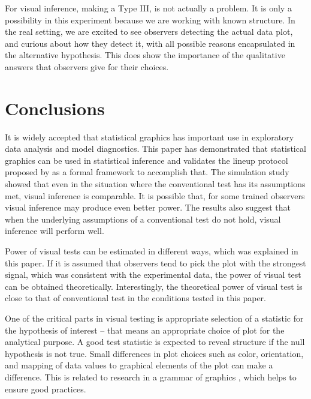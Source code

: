 \documentclass{article}
\begin{document}
For visual inference, making a Type III, is not actually a problem. It is only a possibility in this experiment because we are working with known structure. In the real setting, we are excited to see observers detecting the actual data plot, and curious about how they detect it, with all possible reasons encapsulated in the alternative hypothesis. This does show the importance of the qualitative answers that observers give for their choices.

\section{Conclusions}



It is widely accepted that statistical graphics has important use in exploratory data analysis and model diagnostics. This paper has demonstrated that statistical graphics can be used in statistical inference and validates the lineup protocol proposed by \citet{buja:2009} as a formal framework to accomplish that. The simulation study showed that even in the situation where the conventional test has its assumptions met, visual inference is comparable. It is possible that, for some trained observers visual inference may produce even better power. The results also suggest that when the underlying assumptions of a conventional test do not hold, visual inference will perform well. 

Power of visual tests can be estimated in different ways, which was explained in this paper. If it is assumed that observers tend to pick the plot with the strongest signal, which was consistent with the experimental data, the power of visual test can be obtained theoretically.  Interestingly, the theoretical power of visual test is close to that of conventional test in the conditions tested in this paper.


One of the critical parts in visual testing is appropriate selection of a statistic for the hypothesis of interest -- that means an appropriate choice of plot for the analytical purpose.  A good test statistic is expected to reveal structure if the null hypothesis is not true. Small differences in plot choices such as color, orientation, and mapping of data values to graphical elements of the plot can make a difference. This is related to research in a grammar of graphics \citep{wilkinson:1999,hadley:2009}, which helps to ensure good practices. %
\end{document}
